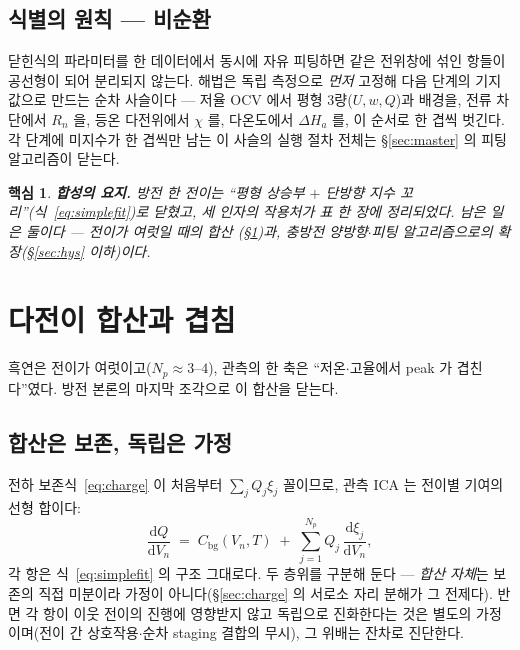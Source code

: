 \documentclass[11pt,a4paper]{article}
\newtheorem*{keybox}{핵심}
\newcommand{\dd}{\mathrm{d}}
\newcommand{\bg}{\mathrm{bg}}
\begin{document}
\subsection{식별의 원칙 — 비순환}
닫힌식의 파라미터를 한 데이터에서 동시에 자유 피팅하면 같은 전위창에 섞인 항들이 공선형이 되어 분리되지
않는다. 해법은 독립 측정으로 \emph{먼저} 고정해 다음 단계의 기지값으로 만드는 순차 사슬이다 — 저율
OCV 에서 평형 3량($U,w,Q$)과 배경을, 전류 차단에서 $R_n$ 을, 등온 다전위에서 $\chi$ 를, 다온도에서
$\Delta H_a$ 를, 이 순서로 한 겹씩 벗긴다. 각 단계에 미지수가 한 겹씩만 남는 이 사슬의 실행 절차 전체는
\S\ref{sec:master} 의 피팅 알고리즘이 닫는다.

\begin{keybox}
\textbf{합성의 요지.} 방전 한 전이는 ``평형 상승부 $+$ 단방향 지수 꼬리''(식~\eqref{eq:simplefit})로
닫혔고, 세 인자의 작용처가 표 한 장에 정리되었다. 남은 일은 둘이다 — 전이가 여럿일 때의 합산
(\S\ref{sec:overlap})과, 충방전 양방향$\cdot$피팅 알고리즘으로의 확장(\S\ref{sec:hys} 이하)이다.
\end{keybox}

\section{다전이 합산과 겹침}\label{sec:overlap}
흑연은 전이가 여럿이고($N_p\approx3\text{--}4$), 관측의 한 축은 ``저온$\cdot$고율에서 peak 가 겹친다''였다.
방전 본론의 마지막 조각으로 이 합산을 닫는다.

\subsection{합산은 보존, 독립은 가정}
전하 보존식~\eqref{eq:charge} 이 처음부터 $\sum_jQ_j\xi_j$ 꼴이므로, 관측 ICA 는 전이별 기여의 선형
합이다:
\begin{equation}
\frac{\dd Q}{\dd V_n}\;=\;C_\bg(V_n,T)\;+\;\sum_{j=1}^{N_p}Q_j\,\frac{\dd\xi_j}{\dd V_n},
\label{eq:total}
\end{equation}
각 항은 식~\eqref{eq:simplefit} 의 구조 그대로다. 두 층위를 구분해 둔다 — \emph{합산 자체}는 보존의 직접
미분이라 가정이 아니다(\S\ref{sec:charge} 의 서로소 자리 분해가 그 전제다). 반면 각 항이 이웃 전이의 진행에 영향받지 않고 독립으로 진화한다는 것은 별도의
가정이며(전이 간 상호작용$\cdot$순차 staging 결합의 무시), 그 위배는 잔차로 진단한다.
\end{document}
